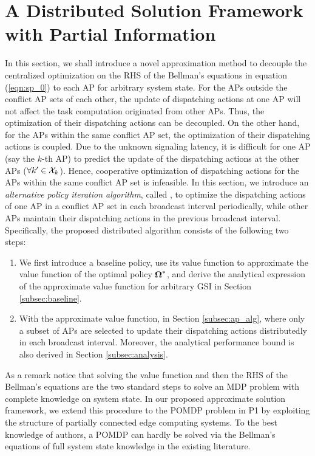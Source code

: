 \section{A Distributed Solution Framework with Partial Information}
\label{sec:algorithm}
In this section, we shall introduce a novel approximation method to decouple the centralized optimization on the RHS of the Bellman's equations in equation (\ref{eqn:sp_0}) to each AP for arbitrary system state.
For the APs outside the conflict AP sets of each other, the update of dispatching actions at one AP will not affect the task computation originated from other APs.
Thus, the optimization of their dispatching actions can be decoupled.
On the other hand, for the APs within the same conflict AP set, the optimization of their dispatching actions is coupled.
Due to the unknown signaling latency, it is difficult for one AP (say the $k$-th AP) to predict the update of the dispatching actions at the other APs ($\forall k' \in\mathcal{X}_{k}$).
Hence, cooperative optimization of dispatching actions for the APs within the same conflict AP set is infeasible.
In this section, we introduce an \emph{alternative policy iteration algorithm}, called \algname, to optimize the dispatching actions of one AP in a conflict AP set in each broadcast interval periodically, while other APs maintain their dispatching actions in the previous broadcast interval.
Specifically, the proposed distributed algorithm consists of the following two steps:
\begin{enumerate}
    \item We first introduce a baseline policy, use its value function to approximate the value function of the optimal policy $\boldsymbol{\Omega}^*$, and derive the analytical expression of the approximate value function for arbitrary GSI in Section \ref{subsec:baseline}.
    \item With the approximate value function, in Section \ref{subsec:ap_alg}, 
    where only a subset of APs are selected to update their dispatching actions distributedly in each broadcast interval.
    Moreover, the analytical performance bound is also derived in Section \ref{subsec:analysis}.
\end{enumerate}
As a remark notice that solving the value function and then the RHS of the Bellman's equations are the two standard steps to solve an MDP problem with complete knowledge on system state.
In our proposed approximate solution framework, we extend this procedure to the POMDP problem in P1 by exploiting the structure of partially connected edge computing systems.
To the best knowledge of authors, a POMDP can hardly be solved via the Bellman's equations of full system state knowledge in the existing literature.


